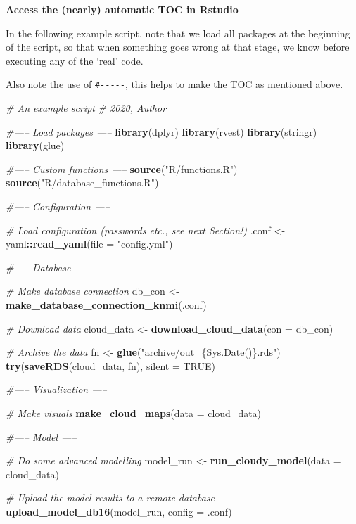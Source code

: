 \documentclass[]{book}
\newenvironment{Shaded}{\begin{snugshade}}{\end{snugshade}}
\newcommand{\CommentTok}[1]{\textcolor[rgb]{0.56,0.35,0.01}{\textit{#1}}}
\newcommand{\DataTypeTok}[1]{\textcolor[rgb]{0.13,0.29,0.53}{#1}}
\newcommand{\KeywordTok}[1]{\textcolor[rgb]{0.13,0.29,0.53}{\textbf{#1}}}
\newcommand{\NormalTok}[1]{#1}
\newcommand{\OperatorTok}[1]{\textcolor[rgb]{0.81,0.36,0.00}{\textbf{#1}}}
\newcommand{\OtherTok}[1]{\textcolor[rgb]{0.56,0.35,0.01}{#1}}
\newcommand{\StringTok}[1]{\textcolor[rgb]{0.31,0.60,0.02}{#1}}
\begin{document}
\textbf{Access the (nearly) automatic TOC in Rstudio}

In the following example script, note that we load all packages at the beginning of the script, so that when something goes wrong at that stage, we know before executing any of the `real' code.

Also note the use of \texttt{\#-\/-\/-\/-\/-}, this helps to make the TOC as mentioned above.

\begin{Shaded}
\begin{Highlighting}[]
\CommentTok{# An example script}
\CommentTok{# 2020, Author}


\CommentTok{#----- Load packages -----}
\KeywordTok{library}\NormalTok{(dplyr)}
\KeywordTok{library}\NormalTok{(rvest)}
\KeywordTok{library}\NormalTok{(stringr)}
\KeywordTok{library}\NormalTok{(glue)}

\CommentTok{#----- Custom functions -----}
\KeywordTok{source}\NormalTok{(}\StringTok{"R/functions.R"}\NormalTok{)}
\KeywordTok{source}\NormalTok{(}\StringTok{"R/database_functions.R"}\NormalTok{)}

\CommentTok{#----- Configuration -----}

\CommentTok{# Load configuration (passwords etc., see next Section!)}
\NormalTok{.conf <-}\StringTok{ }\NormalTok{yaml}\OperatorTok{::}\KeywordTok{read_yaml}\NormalTok{(}\DataTypeTok{file =} \StringTok{"config.yml"}\NormalTok{)}

\CommentTok{#----- Database -----}

\CommentTok{# Make database connection}
\NormalTok{db_con <-}\StringTok{ }\KeywordTok{make_database_connection_knmi}\NormalTok{(.conf)}

\CommentTok{# Download data}
\NormalTok{cloud_data <-}\StringTok{ }\KeywordTok{download_cloud_data}\NormalTok{(}\DataTypeTok{con =}\NormalTok{ db_con)}

\CommentTok{# Archive the data}
\NormalTok{fn <-}\StringTok{ }\KeywordTok{glue}\NormalTok{(}\StringTok{"archive/out_\{Sys.Date()\}.rds"}\NormalTok{)}
\KeywordTok{try}\NormalTok{(}\KeywordTok{saveRDS}\NormalTok{(cloud_data, fn), }\DataTypeTok{silent =} \OtherTok{TRUE}\NormalTok{)}

\CommentTok{#----- Visualization -----}

\CommentTok{# Make visuals}
\KeywordTok{make_cloud_maps}\NormalTok{(}\DataTypeTok{data =}\NormalTok{ cloud_data)}

\CommentTok{#----- Model -----}

\CommentTok{# Do some advanced modelling}
\NormalTok{model_run <-}\StringTok{ }\KeywordTok{run_cloudy_model}\NormalTok{(}\DataTypeTok{data =}\NormalTok{ cloud_data)}

\CommentTok{# Upload the model results to a remote database}
\KeywordTok{upload_model_db16}\NormalTok{(model_run, }\DataTypeTok{config =}\NormalTok{ .conf)}
\end{Highlighting}
\end{Shaded}
\end{document}
